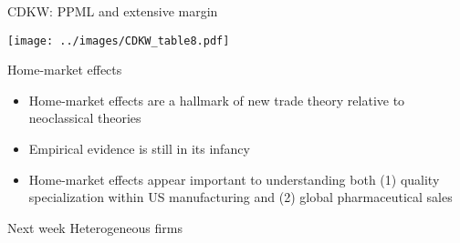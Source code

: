 \documentclass[10pt,notes=hide]{beamer}
\begin{document}
\begin{frame}{CDKW: PPML and extensive margin}
\begin{center}\texttt{[image: ../images/CDKW\_table8.pdf]}\end{center}
\end{frame}
\begin{frame}{Home-market effects}
\begin{itemize}
	\item Home-market effects are a hallmark of new trade theory relative to neoclassical theories
	\item Empirical evidence is still in its infancy
	\item Home-market effects appear important to understanding both (1) quality specialization within US manufacturing and (2) global pharmaceutical sales
\end{itemize}
\end{frame}
\begin{frame}{Next week}
Heterogeneous firms
\end{frame}
\end{document}
